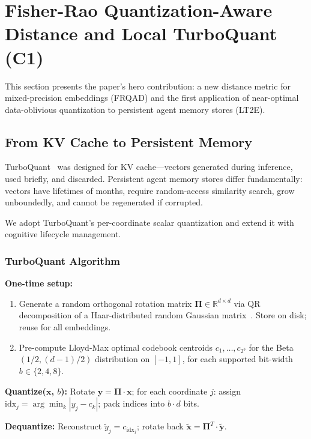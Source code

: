 \section{Fisher-Rao Quantization-Aware Distance and Local TurboQuant (C1)}
\label{sec:quantization}

This section presents the paper's hero contribution: a new distance metric for mixed-precision embeddings (FRQAD) and the first application of near-optimal data-oblivious quantization to persistent agent memory stores (LT2E).

\subsection{From KV Cache to Persistent Memory}

TurboQuant~\cite{turboquant} was designed for KV cache---vectors generated during inference, used briefly, and discarded. Persistent agent memory stores differ fundamentally: vectors have lifetimes of months, require random-access similarity search, grow unboundedly, and cannot be regenerated if corrupted.

We adopt TurboQuant's per-coordinate scalar quantization and extend it with cognitive lifecycle management.

\subsubsection{TurboQuant Algorithm}

\textbf{One-time setup:}
\begin{enumerate}[topsep=2pt, itemsep=1pt]
  \item Generate a random orthogonal rotation matrix $\mathbf{\Pi} \in \mathbb{R}^{d \times d}$ via QR decomposition of a Haar-distributed random Gaussian matrix~\cite{mezzadri}. Store on disk; reuse for all embeddings.
  \item Pre-compute Lloyd-Max optimal codebook centroids $c_1, \ldots, c_{2^b}$ for the Beta$(1/2, (d{-}1)/2)$ distribution on $[-1, 1]$, for each supported bit-width $b \in \{2, 4, 8\}$.
\end{enumerate}

\textbf{Quantize($\mathbf{x}$, $b$):} Rotate $\mathbf{y} = \mathbf{\Pi} \cdot \mathbf{x}$; for each coordinate $j$: assign $\text{idx}_j = \arg\min_k |y_j - c_k|$; pack indices into $b \cdot d$ bits.

\textbf{Dequantize:} Reconstruct $\tilde{y}_j = c_{\text{idx}_j}$; rotate back $\tilde{\mathbf{x}} = \mathbf{\Pi}^T \cdot \tilde{\mathbf{y}}$.

